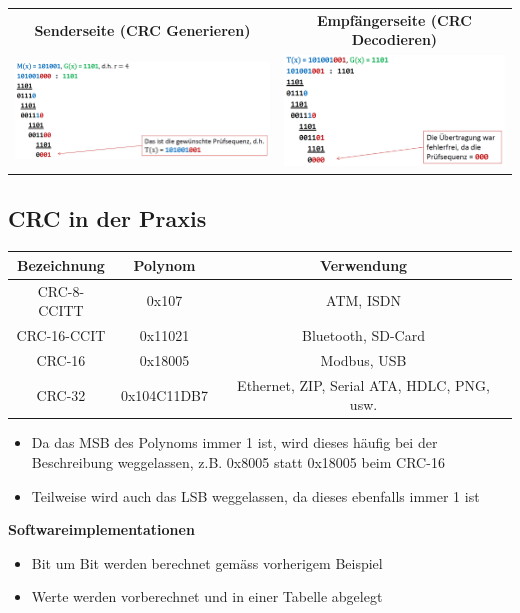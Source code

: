 \begin{tabular}{c|c}
	\textbf{Senderseite (CRC Generieren)} & \textbf{Empfängerseite (CRC Decodieren)} \\
	\includegraphics[width=10cm]{images/CRC/crc-gen.png} & \includegraphics[width=8cm]{images/CRC/crc-enc.png}  \\
\end{tabular}

\subsection{CRC in der Praxis}
\begin{tabular}{|c|c|c|}
\hline \textbf{Bezeichnung} & \textbf{Polynom} & \textbf{Verwendung} \\
\hline CRC-8-CCITT & 0x107 &  ATM, ISDN\\
\hline CRC-16-CCIT & 0x11021 & Bluetooth, SD-Card \\
\hline  CRC-16 & 0x18005  &  Modbus, USB\\
\hline  CRC-32 & 0x104C11DB7 & Ethernet, ZIP, Serial ATA, HDLC, PNG, usw. \\
\hline
\end{tabular}

\begin{itemize}
	\item Da das MSB des Polynoms immer 1 ist, wird dieses häufig bei der Beschreibung weggelassen, z.B. 0x8005 statt 0x18005 beim CRC-16
	\item Teilweise wird auch das LSB weggelassen, da dieses ebenfalls immer 1 ist
\end{itemize}

\textbf{Softwareimplementationen}
\begin{itemize}
	\item Bit um Bit werden berechnet gemäss vorherigem Beispiel
	\item Werte werden vorberechnet und in einer Tabelle abgelegt
\end{itemize}

